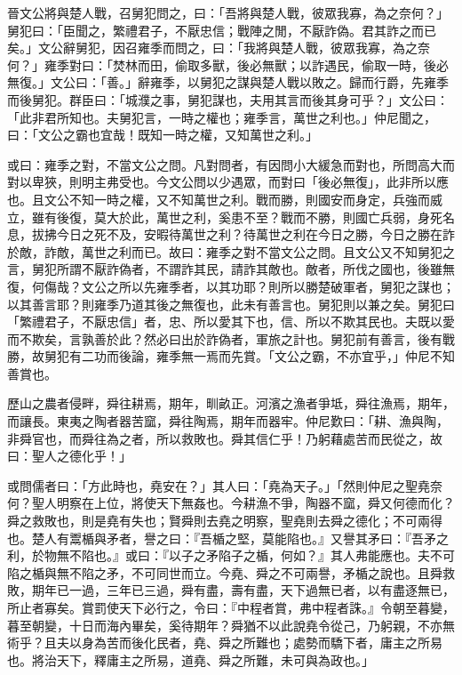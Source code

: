 
\begin{pinyinscope}
晉文公將與楚人戰，召舅犯問之，曰：「吾將與楚人戰，彼眾我寡，為之奈何？」舅犯曰：「臣聞之，繁禮君子，不厭忠信；戰陣之閒，不厭詐偽。君其詐之而已矣。」文公辭舅犯，因召雍季而問之，曰：「我將與楚人戰，彼眾我寡，為之奈何？」雍季對曰：「焚林而田，偷取多獸，後必無獸；以詐遇民，偷取一時，後必無復。」文公曰：「善。」辭雍季，以舅犯之謀與楚人戰以敗之。歸而行爵，先雍季而後舅犯。群臣曰：「城濮之事，舅犯謀也，夫用其言而後其身可乎？」文公曰：「此非君所知也。夫舅犯言，一時之權也；雍季言，萬世之利也。」仲尼聞之，曰：「文公之霸也宜哉！既知一時之權，又知萬世之利。」

或曰：雍季之對，不當文公之問。凡對問者，有因問小大緩急而對也，所問高大而對以卑狹，則明主弗受也。今文公問以少遇眾，而對曰「後必無復」，此非所以應也。且文公不知一時之權，又不知萬世之利。戰而勝，則國安而身定，兵強而威立，雖有後復，莫大於此，萬世之利，奚患不至？戰而不勝，則國亡兵弱，身死名息，拔拂今日之死不及，安暇待萬世之利？待萬世之利在今日之勝，今日之勝在詐於敵，詐敵，萬世之利而已。故曰：雍季之對不當文公之問。且文公又不知舅犯之言，舅犯所謂不厭詐偽者，不謂詐其民，請詐其敵也。敵者，所伐之國也，後雖無復，何傷哉？文公之所以先雍季者，以其功耶？則所以勝楚破軍者，舅犯之謀也；以其善言耶？則雍季乃道其後之無復也，此未有善言也。舅犯則以兼之矣。舅犯曰「繁禮君子，不厭忠信」者，忠、所以愛其下也，信、所以不欺其民也。夫既以愛而不欺矣，言孰善於此？然必曰出於詐偽者，軍旅之計也。舅犯前有善言，後有戰勝，故舅犯有二功而後論，雍季無一焉而先賞。「文公之霸，不亦宜乎，」仲尼不知善賞也。

歷山之農者侵畔，舜往耕焉，期年，甽畝正。河濱之漁者爭坻，舜往漁焉，期年，而讓長。東夷之陶者器苦窳，舜往陶焉，期年而器牢。仲尼歎曰：「耕、漁與陶，非舜官也，而舜往為之者，所以救敗也。舜其信仁乎！乃躬藉處苦而民從之，故曰：聖人之德化乎！」

或問儒者曰：「方此時也，堯安在？」其人曰：「堯為天子。」「然則仲尼之聖堯奈何？聖人明察在上位，將使天下無姦也。今耕漁不爭，陶器不窳，舜又何德而化？舜之救敗也，則是堯有失也；賢舜則去堯之明察，聖堯則去舜之德化；不可兩得也。楚人有鬻楯與矛者，譽之曰：『吾楯之堅，莫能陷也。』又譽其矛曰：『吾矛之利，於物無不陷也。』或曰：『以子之矛陷子之楯，何如？』其人弗能應也。夫不可陷之楯與無不陷之矛，不可同世而立。今堯、舜之不可兩譽，矛楯之說也。且舜救敗，期年已一過，三年已三過，舜有盡，壽有盡，天下過無已者，以有盡逐無已，所止者寡矣。賞罰使天下必行之，令曰：『中程者賞，弗中程者誅。』令朝至暮變，暮至朝變，十日而海內畢矣，奚待期年？舜猶不以此說堯令從己，乃躬親，不亦無術乎？且夫以身為苦而後化民者，堯、舜之所難也；處勢而驕下者，庸主之所易也。將治天下，釋庸主之所易，道堯、舜之所難，未可與為政也。」


\end{pinyinscope}
